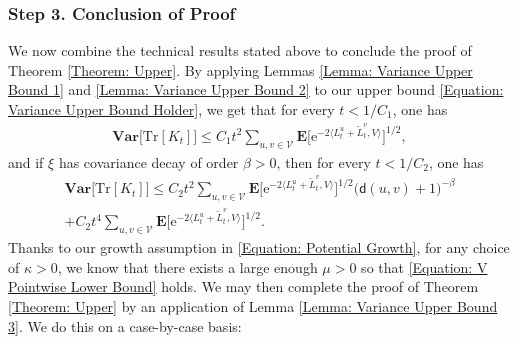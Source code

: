 \documentclass{amsart}
\numberwithin{equation}{section}
\theoremstyle{definition}
\newcommand\be{\beta}
\newcommand\ka{\kappa}
\newcommand\mbf{\mathbf}
\newcommand\mr{\mathrm}
\newcommand\ms{\mathscr}
\newcommand\msf{\mathsf}
\begin{document}
%

\subsubsection{Step 3. Conclusion of Proof}

%

We now combine the technical results stated above to conclude the proof of Theorem
\ref{Theorem: Upper}.
By applying Lemmas \ref{Lemma: Variance Upper Bound 1} and \ref{Lemma: Variance Upper Bound 2}
to our upper bound \eqref{Equation: Variance Upper Bound Holder}, we get that for every $t<1/C_1$, one has
\begin{align}
\label{Equation: Main Proof General}
\mbf{Var}\big[\mr{Tr}[K_t]\big]\leq C_1 t^2\sum_{u,v\in\ms V}\mbf E\Big[\mr e^{-2\langle L^u_t+\tilde L^v_t,V\rangle}\Big]^{1/2},
\end{align}
and if $\xi$ has covariance decay of order $\be>0$, then for every $t<1/C_2$, one has
\begin{multline}
\label{Equation: Main Proof Decay}
\mbf{Var}\big[\mr{Tr}[K_t]\big]\leq C_2 t^2\sum_{u,v\in\ms V}\mbf E\Big[\mr e^{-2\langle L^u_t+\tilde L^v_t,V\rangle}\Big]^{1/2}\big(\msf d(u,v)+1\big)^{-\be}\\
+C_2t^4\sum_{u,v\in\ms V}\mbf E\Big[\mr e^{-2\langle L^u_t+\tilde L^v_t,V\rangle}\Big]^{1/2}.
\end{multline}
Thanks to our growth assumption in \eqref{Equation: Potential Growth}, for any choice of $\ka>0$, we know that there exists
a large enough $\mu>0$ so that \eqref{Equation: V Pointwise Lower Bound} holds. We may then complete the proof
of Theorem \ref{Theorem: Upper} by an application of Lemma \ref{Lemma: Variance Upper Bound 3}. We do this on a case-by-case
basis:

%
\end{document}
